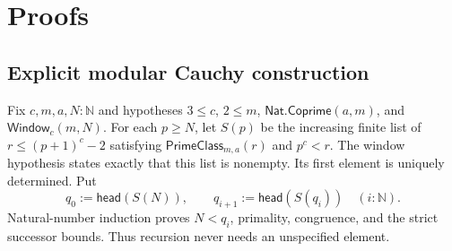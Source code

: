 \documentclass[11pt,reqno]{amsart}
\newcommand{\N}{\mathbb N}
\theoremstyle{blueplain}
\newcounter{type}
\numberwithin{equation}{section}
\begin{document}
\section{Proofs}\label{sec:proofs}

\subsection*{Explicit modular Cauchy construction}\label{sec:typed-cauchy-proof}
Fix $c,m,a,N:\N$ and hypotheses
$3\le c$, $2\le m$, $\textsf{Nat.Coprime}(a,m)$,
and $\textsf{Window}_c(m,N)$. For each $p\ge N$, let $S(p)$ be the
increasing finite list of $r\le(p+1)^c-2$ satisfying
$\textsf{PrimeClass}_{m,a}(r)$ and $p^c<r$.
The window hypothesis states exactly that this list is nonempty.
Its first element is uniquely determined. Put
\[
q_0:=\textsf{head}(S(N)),\qquad
q_{i+1}:=\textsf{head}(S(q_i))\quad(i:\N).
\]
Natural-number induction proves $N<q_i$, primality, congruence, and the
strict successor bounds. Thus recursion never needs an unspecified element.
\end{document}
